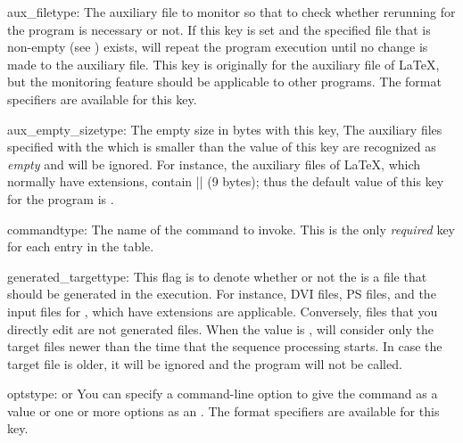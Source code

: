 \documentclass[draft]{llmk-doc}
\begin{document}
\begin{confkey}{aux\_file}{type: }
The auxiliary file to monitor so that to check whether rerunning for the
program is necessary or not. If this key is set and the specified file that is
non-empty (see ) exists,  will repeat the
program execution until no change is made to the auxiliary file. This key is
originally for the auxiliary file of {\LaTeX}, but the monitoring feature
should be applicable to other programs. The format specifiers are available
for this key.
\end{confkey}

\begin{confkey}{aux\_empty\_size}{type: }
The empty size in bytes with this key, The auxiliary files specified with the
 which is smaller than the value of this key are recognized as
\emph{empty} and will be ignored. For instance, the auxiliary files of {\LaTeX},
which normally have  extensions, contain
|\textvisiblespace{}| (9 bytes); thus the default
value of this key for the  program is .
\end{confkey}

\begin{confkey}{command}{type: }
The name of the command to invoke. This is the only \emph{required} key for
each entry in the  table.
\end{confkey}

\begin{confkey}{generated\_target}{type: }
This flag is to denote whether or not the  is a file that should
be generated in the  execution. For instance, DVI files, PS files,
and the input files for , which have  extensions are
applicable. Conversely, files that you directly edit are not generated files.
When the value is ,  will consider only the target files
newer than the time that the sequence processing starts. In case the target
file is older, it will be ignored and the program will not be called.
\end{confkey}

\begin{confkey}{opts}{type:  or }
You can specify a command-line option to give the command as a 
value or one or more options as an . The format
specifiers are available for this key.
\end{confkey}
\end{document}
